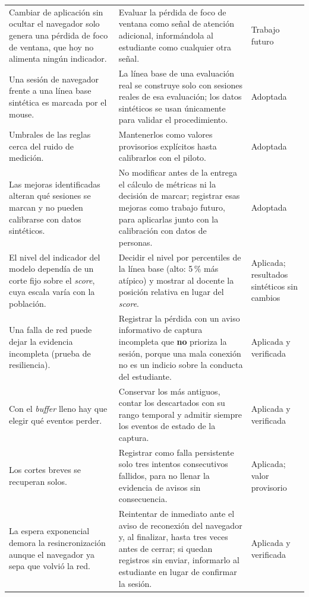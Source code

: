 {\begin{longtable}{>{\raggedright\arraybackslash}p{4.6cm} >{\raggedright\arraybackslash}p{6.4cm} >{\raggedright\arraybackslash}p{2.6cm}}
    Cambiar de aplicación sin ocultar el navegador solo genera una pérdida de foco de ventana, que hoy no alimenta ningún indicador. & Evaluar la pérdida de foco de ventana como señal de atención adicional, informándola al estudiante como cualquier otra señal. & Trabajo futuro \\
    Una sesión de navegador frente a una línea base sintética es marcada por el mouse. & La línea base de una evaluación real se construye solo con sesiones reales de esa evaluación; los datos sintéticos se usan únicamente para validar el procedimiento. & Adoptada \\
    Umbrales de las reglas cerca del ruido de medición. & Mantenerlos como valores provisorios explícitos hasta calibrarlos con el piloto. & Adoptada \\
    Las mejoras identificadas alteran qué sesiones se marcan y no pueden calibrarse con datos sintéticos. & No modificar antes de la entrega el cálculo de métricas ni la decisión de marcar; registrar esas mejoras como trabajo futuro, para aplicarlas junto con la calibración con datos de personas. & Adoptada \\
    El nivel del indicador del modelo dependía de un corte fijo sobre el \textit{score}, cuya escala varía con la población. & Decidir el nivel por percentiles de la línea base (alto: 5\,\% más atípico) y mostrar al docente la posición relativa en lugar del \textit{score}. & Aplicada; resultados sintéticos sin cambios \\
    Una falla de red puede dejar la evidencia incompleta (prueba de resiliencia). & Registrar la pérdida con un aviso informativo de captura incompleta que \textbf{no} prioriza la sesión, porque una mala conexión no es un indicio sobre la conducta del estudiante. & Aplicada y verificada \\
    Con el \textit{buffer} lleno hay que elegir qué eventos perder. & Conservar los más antiguos, contar los descartados con su rango temporal y admitir siempre los eventos de estado de la captura. & Aplicada y verificada \\
    Los cortes breves se recuperan solos. & Registrar como falla persistente solo tres intentos consecutivos fallidos, para no llenar la evidencia de avisos sin consecuencia. & Aplicada; valor provisorio \\
    La espera exponencial demora la resincronización aunque el navegador ya sepa que volvió la red. & Reintentar de inmediato ante el aviso de reconexión del navegador y, al finalizar, hasta tres veces antes de cerrar; si quedan registros sin enviar, informarlo al estudiante en lugar de confirmar la sesión. & Aplicada y verificada \\

\end{longtable}}
